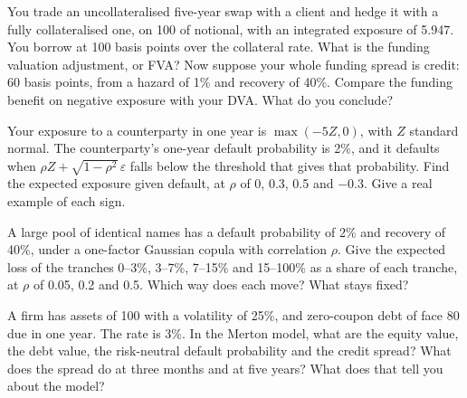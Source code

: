\begin{question}\label{iq:iv2:credit-and-xva:15}
You trade an uncollateralised five-year swap with a client and hedge it with a fully collateralised one, on 100 of notional, with an integrated exposure of 5.947. You borrow at 100 basis points over the collateral rate. What is the funding valuation adjustment, or FVA? Now suppose your whole funding spread is credit: 60 basis points, from a hazard of 1\% and recovery of 40\%. Compare the funding benefit on negative exposure with your DVA. What do you conclude?
\end{question}

\begin{question}\label{iq:iv2:credit-and-xva:16}
Your exposure to a counterparty in one year is $\max(-5Z, 0)$, with $Z$ standard normal. The counterparty's one-year default probability is 2\%, and it defaults when $\rho Z + \sqrt{1 - \rho^2}\,\varepsilon$ falls below the threshold that gives that probability. Find the expected exposure given default, at $\rho$ of 0, 0.3, 0.5 and $-0.3$. Give a real example of each sign.
\end{question}

\begin{question}\label{iq:iv2:credit-and-xva:17}
A large pool of identical names has a default probability of 2\% and recovery of 40\%, under a one-factor Gaussian copula with correlation $\rho$. Give the expected loss of the tranches 0--3\%, 3--7\%, 7--15\% and 15--100\% as a share of each tranche, at $\rho$ of 0.05, 0.2 and 0.5. Which way does each move? What stays fixed?
\end{question}

\begin{question}\label{iq:iv2:credit-and-xva:18}
A firm has assets of 100 with a volatility of 25\%, and zero-coupon debt of face 80 due in one year. The rate is 3\%. In the Merton model, what are the equity value, the debt value, the risk-neutral default probability and the credit spread? What does the spread do at three months and at five years? What does that tell you about the model?
\end{question}

